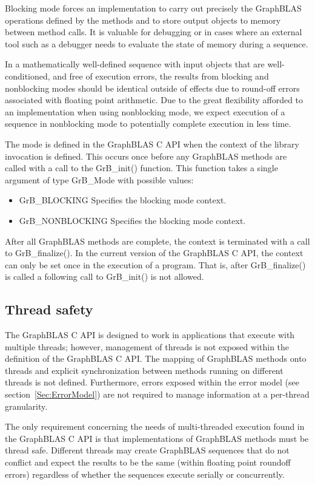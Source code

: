 Blocking mode forces an implementation to carry out precisely the
GraphBLAS operations defined by the methods and to store output objects
to memory between method calls.  It is valuable for debugging or in
cases where an external tool such as a debugger needs to evaluate the
state of memory during a sequence.

In a  mathematically well-defined sequence with input objects that
are well-conditioned, and free of execution errors, the results from
blocking and nonblocking modes should be identical outside of effects
due to round-off errors associated with floating point arithmetic.
Due to the great flexibility afforded to an implementation when using
nonblocking mode, we expect execution of a sequence in nonblocking mode
to potentially complete execution in less time.

The mode is defined in the GraphBLAS C API when the context of the
library invocation is defined.  This occurs once before any GraphBLAS
methods are called with a call to the {\sf GrB\_init()} function.  This function
takes a single argument of type {\sf GrB\_Mode} with possible values:
\begin{itemize}
\item {\sf GrB\_BLOCKING} Specifies the blocking mode context.
\item {\sf GrB\_NONBLOCKING} Specifies the blocking mode context.
\end{itemize}
After all GraphBLAS methods are complete, the context is terminated
with a call to {\sf GrB\_finalize()}.  In the current version of the
GraphBLAS C API, the context can only be set once in the execution of
a program. That is, after {\sf GrB\_finalize()} is called a following
call to {\sf GrB\_init()} is not allowed.


\subsection{Thread safety}
\label{Sec:ThreadSafety}

The GraphBLAS C API is designed to work in applications that execute with multiple threads; however, 
management of threads is not exposed within the definition of the GraphBLAS C API.   The mapping of 
GraphBLAS methods onto threads and explicit synchronization between methods running on different threads 
is not defined.  Furthermore, errors exposed within the error model (see section~\ref{Sec:ErrorModel}) are
not required to manage information at a per-thread granularity.

The only requirement concerning the needs of multi-threaded execution found in the GraphBLAS C API
is that implementations of GraphBLAS methods must be thread safe.  Different threads 
may create GraphBLAS sequences that do not conflict and expect the results to be the 
same (within floating point roundoff errors) regardless of whether the sequences execute serially or concurrently.

